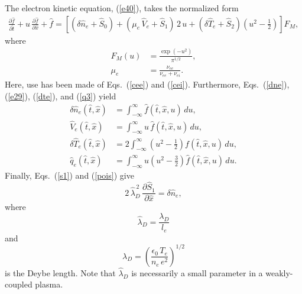 \documentclass[12pt,prb,aps]{revtex4-1}
\begin{document}
The electron kinetic equation, (\ref{e40}), takes the normalized form
\begin{align}\label{e37a}
\frac{\partial\hat{f}}{\partial \hat{t}}+u\,\frac{\partial\hat{f}}{\partial\hat{x}} + \hat{f}
= \left[(\delta\hat{n}_e+\hat{S}_0)+(\mu_e\,\hat{V}_e+\hat{S}_1)\,2\,u+(\delta\hat{T}_e+\hat{S}_2)\left(u^2-\frac{1}{2}\right)\right] F_M,
\end{align}
where
\begin{align}
F_M(u) &=\frac{\exp(-u^2)}{\pi^{1/2}},\\[0.5ex]
\mu_e&= \frac{\nu_{ee}}{\nu_{ee}+\nu_{ei}}.
\end{align}
Here, use has been made of Eqs.~(\ref{cee}) and (\ref{cei}). Furthermore, Eqs.~(\ref{dne}), (\ref{e29}), (\ref{dte}), and (\ref{q3}) yield
\begin{align}\label{e28}
\delta\hat{n}_e(\hat{t},\hat{x})&=\int_{-\infty}^\infty \hat{f}(\hat{t},\hat{x},u)\,du,\\[0.5ex]
\hat{V}_e(\hat{t},\hat{x})&= \int_{-\infty}^\infty u\,\hat{f}(\hat{t},\hat{x},u)\,du,\\[0.5ex]
\delta\hat{T}_e(\hat{t},\hat{x})&= 2\int_{-\infty}^\infty \left(u^2-\frac{1}{2}\right)f(\hat{t},\hat{x},u)\,du,\label{e30}\\[0.5ex]
\hat{q}_e(\hat{t},\hat{x})&= \int_{-\infty}^\infty u\left(u^2-\frac{3}{2}\right)\hat{f}(\hat{t},\hat{x},u)\,du.
\end{align}
Finally, Eqs.~(\ref{s1}) and (\ref{pois}) give
\begin{equation}\label{e44a}
2\,\hat{\lambda}_D^{\,2}\,\frac{\partial\hat{S}_1}{\partial \hat{x}} = \delta\hat{n}_e,
\end{equation}
where
\begin{equation}
\hat{\lambda}_D = \frac{\lambda_D}{l_e}
\end{equation}
and
\begin{equation}
\lambda_D = \left(\frac{\epsilon_0\,T_e}{n_e\,e^2}\right)^{1/2}
\end{equation}
is the Deybe length.\cite{rf0} Note that $\hat{\lambda}_D$ is necessarily a small parameter in a weakly-coupled plasma.\cite{rf0}
\end{document}
